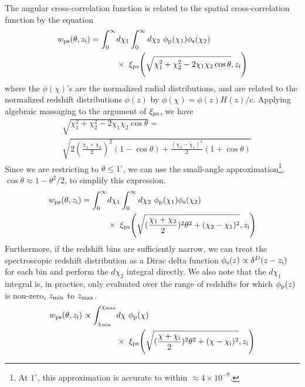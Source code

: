 \documentclass[a4paper,usenatbib]{mnras}
\begin{document}
The angular cross-correlation function is related to the spatial cross-correlation function by the equation
%
\begin{align}\label{first}
    {w}_{\rm ps}(\theta, z_{\rm i}) = \int_{0}^{\infty}&d\chi_1\int_{0}^{\infty}d\chi_2 \ \phi_{\rm p}(\chi_1) \phi_{\rm s}(\chi_2) \nonumber \\ 
    &\times \ \xi_{\rm ps}{\Bigg (}\sqrt{\chi_1^2 + \chi_2^2 - 2\chi_1\chi_2\cos{\theta}},z_{\rm i}{\Bigg )}
\end{align}
%
where the $\phi(\chi)$'s are the normalized radial distributions, and are related to the normalized redshift distributions $\phi(z)$ by $\phi(\chi) = \phi(z)H(z)/c$. Applying algebraic massaging to the argument of $\xi_{\rm ps}$, we have
%
\begin{align}\label{massage_R}
&\sqrt[]{\chi_1^2 + \chi_2^2 - 2\chi_1\chi_2\cos{\theta}} = \nonumber \\
&\sqrt[]{2(\frac{\chi_1 + \chi_2}{2})^2(1-\cos{\theta}) + \frac{(\chi_2 - \chi_1)^2}{2}(1+\cos{\theta})}
\end{align}
%
Since we are restricting to $\theta \leq 1^{\circ}$, we can use the small-angle approximation\footnote{At $1^{\circ}$, this approximation is accurate to within $\approx 4 \times 10^{-9}$.}, $\cos{\theta} \approx 1 - \theta^2/2$, to simplify this expression.
%
\begin{align}\label{after_smallangle}
    {w}_{\rm ps}(\theta, z_{\rm i}) = \int_{0}^{\infty}&d\chi_1\int_{0}^{\infty}d\chi_2 \ \phi_{\rm p}(\chi_1) \phi_{\rm s}(\chi_2) \nonumber \\
    &\times \ \xi_{\rm ps}{\Bigg (}\sqrt{(\frac{\chi_1 + \chi_2}{2})^2\theta^2 + (\chi_2-\chi_1)^2},z_{\rm i}{\Bigg )}
\end{align}
%
Furthermore, if the redshift bins are sufficiently narrow, we can treat the spectroscopic redshift distribution as a Dirac delta function $\phi_{\rm s}(z) \propto\delta^{D}(z - z_{\rm i})$ for each bin and perform the $d\chi_2$ integral directly. We also note that the $d\chi_1$ integral is, in practice, only evaluated over the range of redshifts for which $\phi_{\rm p}(z)$ is non-zero, $z_{\rm min}$ to $z_{\rm max}$. 
%
\begin{align}\label{after_dirac}
    {w}_{\rm ps}(\theta, z_{\rm i}) \propto \int_{\chi_{\rm min}}^{\chi_{\rm max}} &d\chi \ \phi_{\rm p}(\chi) \nonumber \\
    &\times \ \xi_{\rm ps}{\Bigg (}\sqrt{(\frac{\chi + \chi_{\rm i}}{2})^2\theta^2 + (\chi-\chi_{\rm i})^2},z_{\rm i}{\Bigg )}
\end{align}
%
\end{document}
